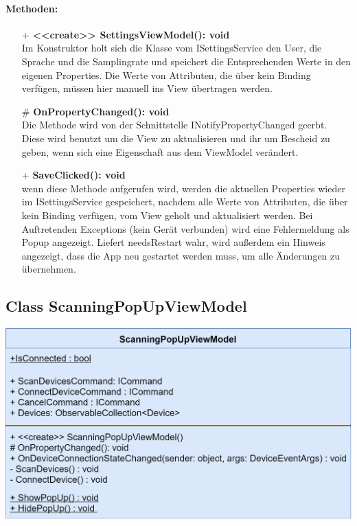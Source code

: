 \documentclass[a4paper,12pt]{article}
\begin{document}
\paragraph{Methoden:}
\begin{itemize}
    \item[+] \textbf{<<create>> SettingsViewModel(): void}\\ Im Konstruktor holt sich die Klasse vom ISettingsService den User, die Sprache und die Samplingrate und speichert die Entsprechenden Werte in den eigenen Properties. Die Werte von Attributen, die über kein Binding verfügen, müssen hier manuell ins View übertragen werden.
    \item[\#] \textbf{OnPropertyChanged(): void}\\ Die Methode wird von der Schnittstelle INotifyPropertyChanged geerbt. Diese wird benutzt um die View zu aktualisieren und ihr um Bescheid zu geben, wenn sich eine Eigenschaft aus dem ViewModel verändert. 
    \item[+] \textbf{SaveClicked(): void}\\ wenn diese Methode aufgerufen wird, werden die aktuellen Properties wieder im ISettingsService gespeichert, nachdem alle Werte von Attributen, die über kein Binding verfügen, vom View geholt und aktualisiert werden. Bei Auftretenden Exceptions (kein Gerät verbunden) wird eine Fehlermeldung als Popup angezeigt. Liefert needsRestart wahr, wird außerdem ein Hinweis angezeigt, dass die App neu gestartet werden muss, um alle Änderungen zu übernehmen.\\

\end{itemize} 


\subsection{Class ScanningPopUpViewModel}
	\includegraphics{bilder/ViewmodelKlassen/ScanningPopUpViewModelClass.png}
\end{document}
